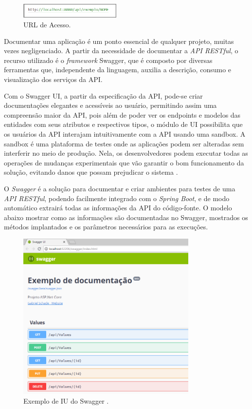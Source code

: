     \begin{figure}[h]
    \centering
    \includegraphics[width=0.45\textwidth]{./img/Endereço.png}
    \caption{URL de Acesso.}
    \label{fig:Endereço}
    \end{figure}
    
    
    Documentar uma aplicação é um ponto essencial de qualquer projeto, muitas vezes negligenciado. A partir da necessidade de documentar a \textit{API RESTful}, o recurso utilizado é o \textit{framework} Swagger, que é composto por diversas ferramentas que, independente da linguagem, auxilia a descrição, consumo e visualização dos serviços da API.

     Com o Swagger UI, a partir da especificação da API, pode-se criar documentações elegantes e acessíveis ao usuário, permitindo assim uma compreensão maior da API, pois além de poder ver os endpoints e modelos das entidades com seus atributos e respectivos tipos, o módulo de UI possibilita que os usuários da API interajam intuitivamente com a API usando uma sandbox. A sandbox é uma plataforma de testes onde as aplicações podem ser alteradas sem interferir no meio de produção. Nela, os desenvolvedores podem executar todas as operações de mudanças experimentais que vão garantir o bom funcionamento da solução, evitando danos que possam prejudicar o sistema \cite{diasW}.
     
    O \textit{Swagger} é a solução para documentar e criar ambientes para testes de uma \textit{API RESTful}, podendo facilmente integrado com o \textit{Spring Boot}, e de modo automático extrairá todas as informações da API do código-fonte. O modelo abaixo mostrar como as informações são documentadas no Swagger, mostrados os métodos implantados e os parâmetros necessários para as execuções.
    
    \begin{figure}[h]
    \centering
    \includegraphics[width=0.80\textwidth]{./img/ExemploIUSwagger.png}
    \caption{Exemplo de IU do Swagger .}
    \label{fig:ExemploIUSwagger}
    \end{figure}


